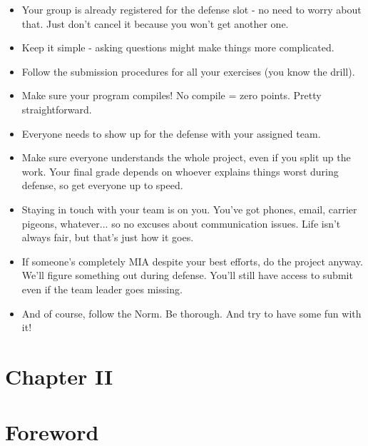 \documentclass[12pt]{article}
\begin{document}
\begin{itemize}
  \item Your group is already registered for the defense slot - no need to worry about that. Just don't cancel it because you won't get another one.
  \item Keep it simple - asking questions might make things more complicated.
  \item Follow the submission procedures for all your exercises (you know the drill).
  \item Make sure your program compiles! No compile = zero points. Pretty straightforward.
  \item Everyone needs to show up for the defense with your assigned team.
  \item Make sure everyone understands the whole project, even if you split up the work. Your final grade depends on whoever explains things worst during defense, so get everyone up to speed.
  \item Staying in touch with your team is on you. You've got phones, email, carrier pigeons, whatever... so no excuses about communication issues. Life isn't always fair, but that's just how it goes.
  \item If someone's completely MIA despite your best efforts, do the project anyway. We'll figure something out during defense. You'll still have access to submit even if the team leader goes missing.
  \item And of course, follow the Norm. Be thorough. And try to have some fun with it!
\end{itemize}

\newpage

\section*{\LARGE Chapter II}
\section*{\LARGE Foreword}
\end{document}
